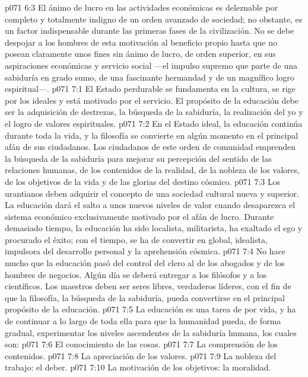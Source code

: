 \vs p071 6:3 El ánimo de lucro en las actividades económicas es deleznable por completo y totalmente indigno de un orden avanzado de sociedad; no obstante, es un factor indispensable durante las primeras fases de la civilización. No se debe despojar a los hombres de esta motivación al beneficio propio hasta que no posean claramente unos fines sin ánimo de lucro, de orden superior, en sus aspiraciones económicas y servicio social ---el impulso supremo que parte de una sabiduría en grado sumo, de una fascinante hermandad y de un magnífico logro espiritual---.
\vs p071 7:1 El Estado perdurable se fundamenta en la cultura, se rige por los ideales y está motivado por el servicio. El propósito de la educación debe ser la adquisición de destrezas, la búsqueda de la sabiduría, la realización del yo y el logro de valores espirituales.
\vs p071 7:2 En el Estado ideal, la educación continúa durante toda la vida, y la filosofía se convierte en algún momento en el principal afán de sus ciudadanos. Los ciudadanos de este orden de comunidad emprenden la búsqueda de la sabiduría para mejorar su percepción del sentido de las relaciones humanas, de los contenidos de la realidad, de la nobleza de los valores, de los objetivos de la vida y de las glorias del destino cósmico.
\vs p071 7:3 Los urantianos deben adquirir el concepto de una sociedad cultural nueva y superior. La educación dará el salto a unos nuevos niveles de valor cuando desaparezca el sistema económico exclusivamente motivado por el afán de lucro. Durante demasiado tiempo, la educación ha sido localista, militarista, ha exaltado el ego y procurado el éxito; con el tiempo, se ha de convertir en global, idealista, impulsora del desarrollo personal y la aprehensión cósmica.
\vs p071 7:4 No hace mucho que la educación pasó del control del clero al de los abogados y de los hombres de negocios. Algún día se deberá entregar a los filósofos y a los científicos. Los maestros deben ser seres libres, verdaderos líderes, con el fin de que la filosofía, la búsqueda de la sabiduría, pueda convertirse en el principal propósito de la educación.
\vs p071 7:5 La educación es una tarea de por vida, y ha de continuar a lo largo de toda ella para que la humanidad pueda, de forma gradual, experimentar los niveles ascendentes de la sabiduría humana, los cuales son:
\vs p071 7:6 El conocimiento de las cosas.
\vs p071 7:7 La comprensión de los contenidos.
\vs p071 7:8 La apreciación de los valores.
\vs p071 7:9 La nobleza del trabajo: el deber.
\vs p071 7:10 La motivación de los objetivos: la moralidad.
